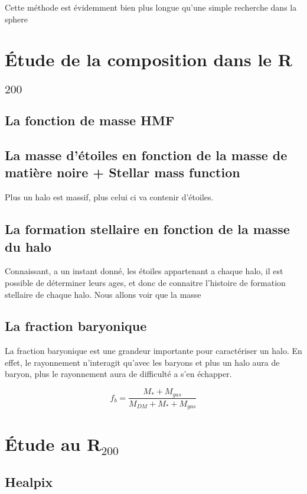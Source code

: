 Cette méthode est évidemment bien plus longue qu'une simple recherche dans la sphere

\section{Étude de la composition dans le R$_{200}$ }


\subsection{La fonction de masse HMF}

\subsection{La masse d'étoiles en fonction de la masse de matière noire + Stellar mass function}
Plus un halo est massif, plus celui ci va contenir d'étoiles.



\subsection{La formation stellaire en fonction de la masse du halo}
Connaissant, a un instant donné, les étoiles appartenant a chaque halo, il est possible de déterminer leurs ages, et donc de connaitre l'histoire de formation stellaire de chaque halo.
Nous allons voir que la masse 

\subsection{La fraction baryonique}
La fraction baryonique est une grandeur importante pour caractériser un halo.
En effet, le rayonnement n'interagit qu'avec les baryons et plus un halo aura de baryon, plus le rayonnement aura de difficulté a s'en échapper.

\begin{equation}
f_b = \frac{M_* + M_{gas} }{M_{DM} + M_* + M_{gas} }
\end{equation}




\section{Étude au R${_200}$}

\subsection{Healpix}
\label{sec:healpix}

